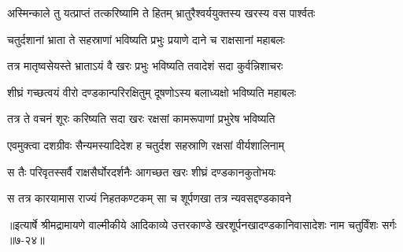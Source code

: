 \twolineshloka
{अस्मिन्काले तु यत्प्राप्तं तत्करिष्यामि ते हितम्}
{भ्रातुरैश्वर्ययुक्तस्य खरस्य वस पार्श्वतः} %

\twolineshloka
{चतुर्दशानां भ्राता ते सहस्राणां भविष्यति}
{प्रभुः प्रयाणे दाने च राक्षसानां महाबलः} %

\twolineshloka
{तत्र मातृष्वसेयस्ते भ्राताऽयं वै खरः प्रभुः}
{भविष्यति तवादेशं सदा कुर्वन्निशाचरः} %

\twolineshloka
{शीघ्रं गच्छत्वयं वीरो दण्डकान्परिरक्षितुम्}
{दूषणोऽस्य बलाध्यक्षो भविष्यति महाबलः} %

\twolineshloka
{तत्र ते वचनं शूरः करिष्यति सदा खरः}
{रक्षसां कामरूपाणां प्रभुरेष भविष्यति} %

\twolineshloka
{एवमुक्त्वा दशग्रीवः सैन्यमस्यादिदेश ह}
{चतुर्दश सहस्राणि रक्षसां वीर्यशालिनाम्} %

\twolineshloka
{स तैः परिवृतस्सर्वै राक्षसैर्घोरदर्शनैः}
{आगच्छत खरः शीघ्रं दण्डकानकुतोभयः} %

\twolineshloka
{स तत्र कारयामास राज्यं निहतकण्टकम्}
{सा च शूर्पणखा तत्र न्यवसद्दण्डकावने} %


॥इत्यार्षे श्रीमद्रामायणे वाल्मीकीये आदिकाव्ये उत्तरकाण्डे खरशूर्पनखादण्डकानिवासादेशः नाम चतुर्विंशः सर्गः ॥७-२४॥
